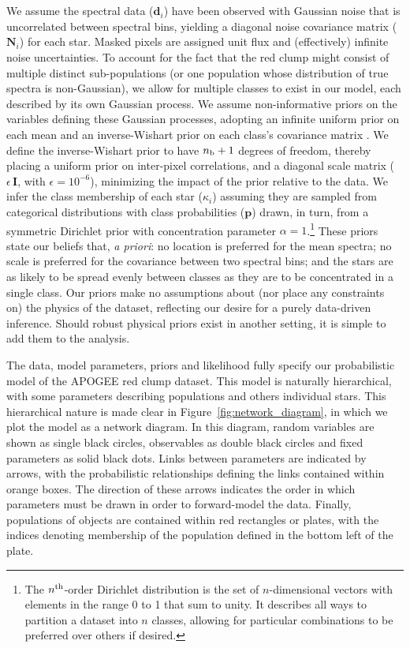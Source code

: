 \documentclass[a4paper,fleqn,usenatbib]{mnras}
\newcommand{\nb}{n_{\rm b}}
\newcommand{\classprobs}{{\bm p}}
\newcommand{\objclass}{{\kappa}}
\newcommand{\objdata}{\hat{\bm d}}
\newcommand{\objnoise}{{\bm N}}
\newcommand{\identity}{{\bm I}}
\begin{document}
We assume the spectral data ($\objdata_i$) have been observed with Gaussian noise that is uncorrelated between spectral bins, yielding a diagonal noise covariance matrix ($\objnoise_i$) for each star. Masked pixels are assigned unit flux and (effectively) infinite noise uncertainties. To account for the fact that the red clump might consist of multiple distinct sub-populations (or one population whose distribution of true spectra is non-Gaussian), we allow for multiple classes to exist in our model, each described by its own Gaussian process. We assume non-informative priors on the variables defining these Gaussian processes, adopting an infinite uniform prior on each mean and an inverse-Wishart prior on each class's covariance matrix \citep[p73]{Gelman_etal:2013}. We define the inverse-Wishart prior to have $\nb+1$ degrees of freedom, thereby placing a uniform prior on inter-pixel correlations, and a diagonal scale matrix ($\epsilon \, \identity$, with $\epsilon=10^{-6}$), minimizing the impact of the prior relative to the data. We infer the class membership of each star ($\objclass_i$) assuming they are sampled from categorical distributions with class probabilities ($\classprobs$) drawn, in turn, from a symmetric Dirichlet prior with concentration parameter $\alpha=1$.\footnote{The $n^{\rm th}$-order Dirichlet distribution is the set of $n$-dimensional vectors with elements in the range 0 to 1 that sum to unity. It describes all ways to partition a dataset into $n$ classes, allowing for particular combinations to be preferred over others if desired.} These priors state our beliefs that, {\it a priori}: no location is preferred for the mean spectra; no scale is preferred for the covariance between two spectral bins; and the stars are as likely to be spread evenly between classes as they are to be concentrated in a single class. Our priors make no assumptions about (nor place any constraints on) the physics of the dataset, reflecting our desire for a purely data-driven inference. Should robust physical priors exist in another setting, it is simple to add them to the analysis.

The data, model parameters, priors and likelihood fully specify our probabilistic model of the APOGEE red clump dataset. This model is naturally hierarchical, with some parameters describing populations and others individual stars. This hierarchical nature is made clear in Figure~\ref{fig:network_diagram}, in which we plot the model as a network diagram. In this diagram, random variables are shown as single black circles, observables as double black circles and fixed parameters as solid black dots. Links between parameters are indicated by arrows, with the probabilistic relationships defining the links contained within orange boxes. The direction of these arrows indicates the order in which parameters must be drawn in order to forward-model the data. Finally, populations of objects are contained within red rectangles or plates, with the indices denoting membership of the population defined in the bottom left of the plate.
\end{document}
